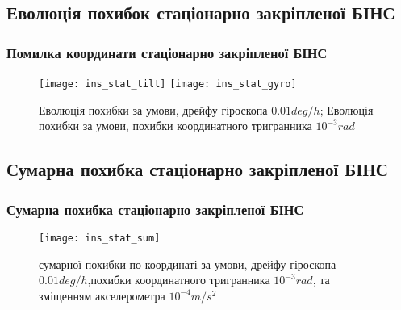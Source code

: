 \documentclass[ucs,compress]{beamer}    %
\begin{document}
\subsection{Еволюція похибок стаціонарно закріпленої БІНС} 
\begin{frame}
\frametitle{Помилка координати стаціонарно закріпленої БІНС}

\begin{figure}[l]
\texttt{[image: ins\_stat\_tilt]}
\texttt{[image: ins\_stat\_gyro]}

\caption{\tiny Еволюція похибки за умови, дрейфу гіроскопа $0.01 deg/h$; Еволюція похибки за умови, похибки координатного тригранника $10^{-3} rad$}
\label{fig:sdins2}
\end{figure}
\end{frame}

\subsection{Сумарна похибка стаціонарно закріпленої БІНС} 
\begin{frame} 
\frametitle{Сумарна похибка стаціонарно закріпленої БІНС}
\begin{figure}[l]
\texttt{[image: ins\_stat\_sum]}
\caption{ сумарної похибки по координаті за умови,
дрейфу гіроскопа   $0.01 deg/h$,похибки координатного тригранника $10^{-3} rad$, та зміщенням акселерометра $10^{-4} m/s^2$}
\label{fig:sdins2}
\end{figure}
\end{frame}

\end{document}

